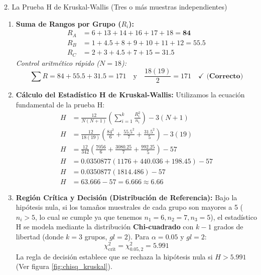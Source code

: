 \documentclass[11pt,a4paper]{article}
\begin{document}
\begin{subsection}{2. La Prueba H de Kruskal-Wallis (Tres o más muestras independientes)}
\begin{enumerate}
              \begin{importante}
                  \textbf{El tratamiento de empates:} En la tabla observamos que el valor $52$ aparece dos veces (posiciones ordinales 4 y 5). En estadística no paramétrica, \textbf{jamás se les asignan rangos arbitrarios} (como 4 al primero y 5 al segundo) porque esto inventaría un orden inexistente. En su lugar, a cada elemento empatado se le asigna el promedio de los rangos que ocuparían conjuntamente:
                  \[ \text{Rango asignado} = \frac{4 + 5}{2} = 4.5 \]
                  Ambas observaciones reciben el rango 4.5 (el cual se reparte entre los sumatorios de los grupos B y C).
              \end{importante}
        \item \textbf{Suma de Rangos por Grupo ($R_i$):}
              \begin{align*}
                  R_A &= 6 + 13 + 14 + 16 + 17 + 18 = \mathbf{84} \\
                  R_B &= 1 + 4.5 + 8 + 9 + 10 + 11 + 12 = \mathbf{55.5} \\
                  R_C &= 2 + 3 + 4.5 + 7 + 15 = \mathbf{31.5}
              \end{align*}
              \textit{Control aritmético rápido ($N=18$):} 
              \[ \sum R = 84 + 55.5 + 31.5 = 171 \quad \text{y} \quad \frac{18(19)}{2} = 171 \quad \mathbf{\checkmark \text{ (Correcto)}} \]
        \item \textbf{Cálculo del Estadístico H de Kruskal-Wallis:}
              Utilizamos la ecuación fundamental de la prueba H:
              \begin{align*}
                  H &= \frac{12}{N(N+1)} \left( \sum_{i=1}^{k} \frac{R_i^2}{n_i} \right) - 3(N+1) \\
                  H &= \frac{12}{18(19)} \left( \frac{84^2}{6} + \frac{55.5^2}{7} + \frac{31.5^2}{5} \right) - 3(19) \\
                  H &= \frac{12}{342} \left( \frac{7056}{6} + \frac{3080.25}{7} + \frac{992.25}{5} \right) - 57 \\
                  H &= 0.0350877 \left( 1176 + 440.036 + 198.45 \right) - 57 \\
                  H &= 0.0350877 \left( 1814.486 \right) - 57 \\
                  H &= 63.666 - 57 = \mathbf{6.666} \approx \mathbf{6.66}
              \end{align*}
        \item \textbf{Región Crítica y Decisión (Distribución de Referencia):}
              Bajo la hipótesis nula, si los tamaños muestrales de cada grupo son mayores a 5 ($n_i > 5$, lo cual se cumple ya que tenemos $n_1=6, n_2=7, n_3=5$), el estadístico H se modela mediante la distribución \textbf{Chi-cuadrado} con $k-1$ grados de libertad (donde $k=3$ grupos, $gl = 2$).
              Para $\alpha = 0.05$ y $gl = 2$:
              \[ \chi^2_{\text{crit}} = \chi^2_{0.05, 2} = \mathbf{5.991} \]
              La regla de decisión establece que se rechaza la hipótesis nula si $H > 5.991$ (Ver figura \ref{fig:chisq_kruskal}).
              

\end{enumerate}
\end{subsection}
\end{document}
